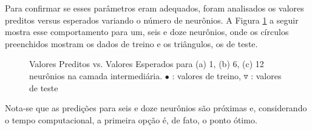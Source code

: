 \documentclass[brazil,tf,epusp]{usp}  %
\begin{document}
Para confirmar se esses parâmetros eram adequados, foram analisados os valores preditos versus esperados variando o número de neurônios. A Figura \ref{fig:predict_NN} a seguir mostra esse comportamento para um, seis e doze neurônios, onde os círculos preenchidos mostram os dados de treino e os triângulos, os de teste.

\begin{figure}[!h]

\caption{Valores Preditos vs. Valores Esperados para (a) 1, (b) 6, (c) 12 neurônios na camada intermediária. $\bullet$ : valores de treino, $\triangledown$ : valores de teste}
\label{fig:predict_NN}
\end{figure}

Nota-se que as predições para seis e doze neurônios são próximas e, considerando o tempo computacional, a primeira opção é, de fato, o ponto ótimo.
\end{document}
